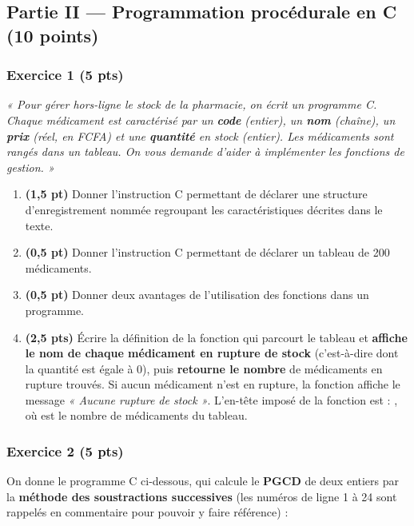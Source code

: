 \subsection*{Partie II — Programmation procédurale en C \hfill (10 points)}

\subsubsection*{Exercice 1 \hfill (5 pts)}

\noindent\emph{« Pour gérer hors-ligne le stock de la pharmacie, on écrit un programme C.
Chaque médicament est caractérisé par un \textbf{code} (entier), un \textbf{nom} (chaîne),
un \textbf{prix} (réel, en FCFA) et une \textbf{quantité} en stock (entier). Les
médicaments sont rangés dans un tableau. On vous demande d'aider à implémenter les
fonctions de gestion. »}

\begin{enumerate}[label=\textbf{\arabic*.}]
\item \textbf{(1,5 pt)} Donner l'instruction C permettant de déclarer une structure
d'enregistrement nommée  regroupant les caractéristiques décrites dans
le texte.
\item \textbf{(0,5 pt)} Donner l'instruction C permettant de déclarer un tableau 
de 200 médicaments.
\item \textbf{(0,5 pt)} Donner deux avantages de l'utilisation des fonctions dans un programme.
\item \textbf{(2,5 pts)} Écrire la définition de la fonction  qui parcourt
le tableau et \textbf{affiche le nom de chaque médicament en rupture de stock}
(c'est-à-dire dont la quantité est égale à 0), puis \textbf{retourne le nombre} de
médicaments en rupture trouvés. Si aucun médicament n'est en rupture, la fonction affiche
le message \emph{« Aucune rupture de stock »}. L'en-tête imposé de la fonction est :
, où  est le nombre de
médicaments du tableau.
\end{enumerate}

\subsubsection*{Exercice 2 \hfill (5 pts)}

\noindent On donne le programme C ci-dessous, qui calcule le \textbf{PGCD} de deux entiers
par la \textbf{méthode des soustractions successives} (les numéros de ligne 1 à 24 sont
rappelés en commentaire pour pouvoir y faire référence) :

